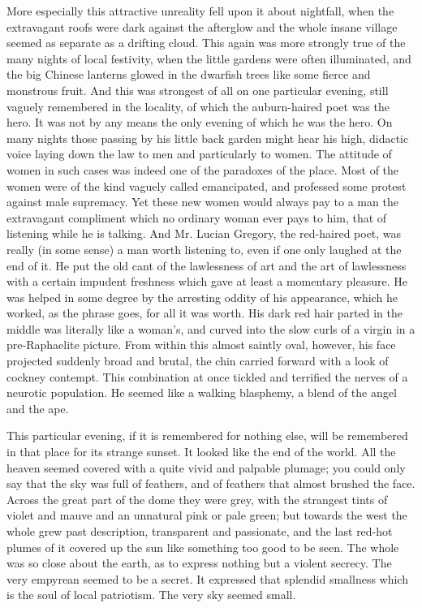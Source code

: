 More especially this attractive unreality fell upon it about nightfall, when the extravagant roofs were dark against the afterglow and the whole insane village seemed as separate as a drifting cloud. This again was more strongly true of the many nights of local festivity, when the little gardens were often illuminated, and the big Chinese lanterns glowed in the dwarfish trees like some fierce and monstrous fruit. And this was strongest of all on one particular evening, still vaguely remembered in the locality, of which the auburn-haired poet was the hero. It was not by any means the only evening of which he was the hero. On many nights those passing by his little back garden might hear his high, didactic voice laying down the law to men and particularly to women. The attitude of women in such cases was indeed one of the paradoxes of the place. Most of the women were of the kind vaguely called emancipated, and professed some protest against male supremacy. Yet these new women would always pay to a man the extravagant compliment which no ordinary woman ever pays to him, that of listening while he is talking. And Mr. Lucian Gregory, the red-haired poet, was really (in some sense) a man worth listening to, even if one only laughed at the end of it. He put the old cant of the lawlessness of art and the art of lawlessness with a certain impudent freshness which gave at least a momentary pleasure. He was helped in some degree by the arresting oddity of his appearance, which he worked, as the phrase goes, for all it was worth. His dark red hair parted in the middle was literally like a woman’s, and curved into the slow curls of a virgin in a pre-Raphaelite picture. From within this almost saintly oval, however, his face projected suddenly broad and brutal, the chin carried forward with a look of cockney contempt. This combination at once tickled and terrified the nerves of a neurotic population. He seemed like a walking blasphemy, a blend of the angel and the ape.

This particular evening, if it is remembered for nothing else, will be remembered in that place for its strange sunset. It looked like the end of the world. All the heaven seemed covered with a quite vivid and palpable plumage; you could only say that the sky was full of feathers, and of feathers that almost brushed the face. Across the great part of the dome they were grey, with the strangest tints of violet and mauve and an unnatural pink or pale green; but towards the west the whole grew past description, transparent and passionate, and the last red-hot plumes of it covered up the sun like something too good to be seen. The whole was so close about the earth, as to express nothing but a violent secrecy. The very empyrean seemed to be a secret. It expressed that splendid smallness which is the soul of local patriotism. The very sky seemed small.

